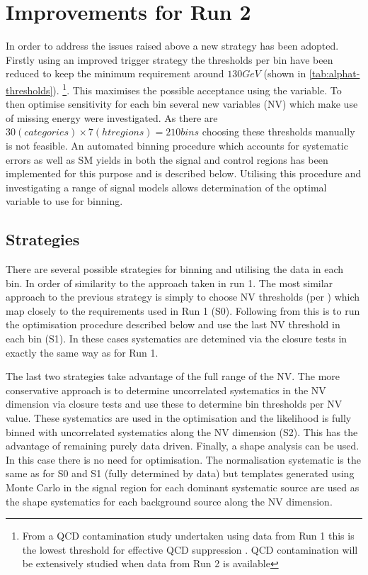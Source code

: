 \section{Improvements for Run 2}

In order to address the issues raised above a new strategy has been adopted. Firstly using an improved trigger strategy the \alphat thresholds per bin have been reduced to keep the minimum \mht requirement around $130 GeV$ (shown in \ref{tab:alphat-thresholds}). \footnote{From a QCD contamination study undertaken using data from Run 1 this is the lowest threshold for effective QCD suppression \cite{ANYTHING}. QCD contamination will be extensively studied when data from Run 2 is available}. This maximises the possible acceptance using the \alphat variable. To then optimise sensitivity for each \scalhtcat bin several new variables (NV) which make use of missing energy were investigated. As there are $30 (categories) \times7 (ht regions) = 210 bins$ choosing these thresholds manually is not feasible. An automated binning procedure which accounts for systematic errors as well as SM yields in both the signal and control regions has been implemented for this purpose and is described below. Utilising this procedure and investigating a range of signal models allows determination of the optimal variable to use for binning.          

\subsection{Strategies}

There are several possible strategies for binning and utilising the data in each \scalhtcat bin. In order of similarity to the approach taken in run 1. The most similar approach to the previous strategy is simply to choose NV thresholds (per \scalht) which map closely to the \alphat requirements used in Run 1 (S0). Following from this is to run the optimisation procedure described below and use the last NV threshold in each \scalhtcat bin (S1). In these cases systematics are detemined via the closure tests in exactly the same way as for Run 1.

The last two strategies take advantage of the full range of the NV. The more conservative approach is to determine uncorrelated systematics in the NV dimension via closure tests and use these to determine bin thresholds per NV value. These systematics are used in the optimisation and the likelihood is fully binned with uncorrelated systematics along the NV dimension (S2). This has the advantage of remaining purely data driven. Finally, a shape analysis can be used. In this case there is no need for optimisation. The normalisation systematic is the same as for S0 and S1 (fully determined by data) but templates generated using Monte Carlo in the signal region for each dominant systematic source are used as the shape systematics for each background source along the NV dimension.



